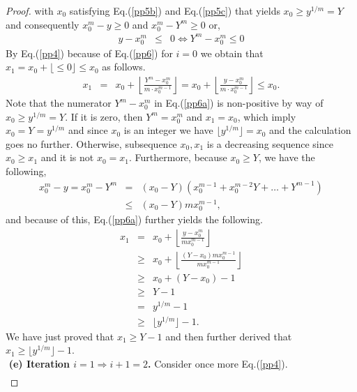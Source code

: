 \documentclass[11pt]{article}
\newcommand{\floor}[1]{\lfloor #1 \rfloor}
\begin{document}
\begin{proof}
with $x_0$  satisfying Eq.(\ref{pp5b}) and Eq.(\ref{pp5c})
that yields $x_0 \geq y^{1/m} =Y$
and consequently  $x_0^m -y \geq 0$ and $x_0^m - Y^m \geq 0$ 
or, 
\begin{eqnarray}
\label{pp6}
y- x_0^m &\leq& 0 \Leftrightarrow  Y^m - x_0^m  \leq 0
\end{eqnarray}
By Eq.(\ref{pp4}) because of Eq.(\ref{pp6}) for $i=0$ we obtain that
$x_1 = x_0 + \floor{ \leq   0}  \leq  x_0$ as follows.
\begin{eqnarray}
\label{pp6a}
x_{1}
&=&
    x_0 + \left\lfloor \frac{Y^m -x_0^m}{m \cdot x_0^{m-1}} \right\rfloor
=
    x_0 + \left\lfloor \frac{y-x_0^m}{m \cdot x_0^{m-1}} \right\rfloor
\leq x_0 .
\end{eqnarray}
Note that the numerator $Y^m -x_0^m$ in Eq.(\ref{pp6a}) is 
non-positive by way of $x_0 \geq y^{1/m} =Y$.
If it is zero, then $Y^m = x_0^m$ and  $x_1 = x_0$,
which imply $x_0 = Y = y^{1/m}$ and since $x_0$
is an integer we have $\lfloor y^{1/m} \rfloor = x_0$ and 
the calculation goes no further.
Otherwise,
subsequence $x_0 , x_1 $ 
is a decreasing sequence since $x_0 \geq x_1 $ and it is not
$x_0 = x_1$.
%
%
%
Furthermore, because $x_0  \geq Y $, we have the following,
\begin{eqnarray}
x_0^m - y   =
x_0^m - Y^m &=& ( x_0 - Y) ( x_0^{m-1} + x_{0}^{m-2}Y + \ldots + Y^{m-1})
\nonumber \\
          &\leq& (x_0 - Y ) m x_0^{m-1} ,
\end{eqnarray}
and because of this, Eq.(\ref{pp6a}) further yields
the following.
%
%
\begin{eqnarray}
\label{ppa}
x_{1  }
   & =  &
    x_0 + \left\lfloor
            \frac{y -x_0^m}{mx_0^{m-1}}
          \right\rfloor  \nonumber  \\
   & \geq  &
   x_0 + \left\lfloor
            \frac{(Y-x_0 )m x_0^{m-1}}{mx_0^{m-1}}
          \right\rfloor  \nonumber  \\
   &\geq&  x_0 + (Y-x_0 ) -1  \nonumber \\
   &\geq&  Y -1   \nonumber \\
   &=&  y^{1/m} -1   \nonumber \\
   &\geq&  \floor{y^{1/m}} -1   .
\end{eqnarray}
We have just proved that 
$x_1 \geq Y -1$ and then further derived that 
$x_{ 1 } \geq \floor{y^{1/m}} -1$.
%
%
$ $ \\ $ $
{\bf (e) Iteration $i=1 \Rightarrow i+1=2$.}
Consider once more Eq.(\ref{pp4}).
\begin{eqnarray}

\end{eqnarray}
\end{proof}
\end{document}
